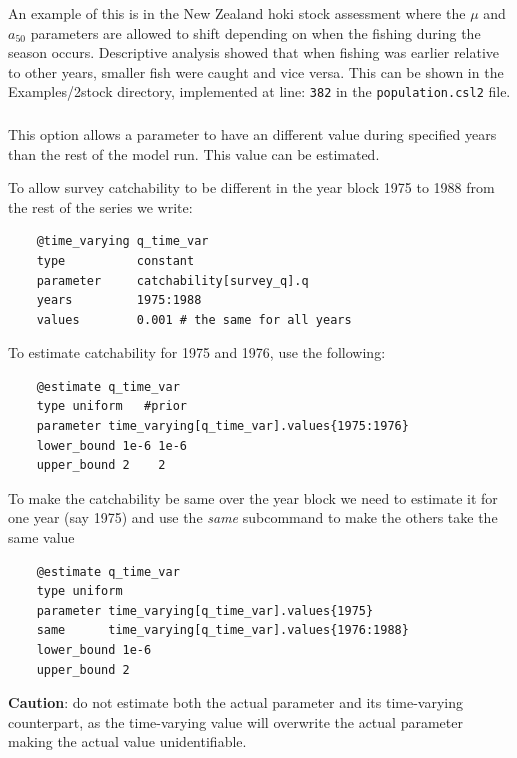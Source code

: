 An example of this is in the New Zealand hoki stock assessment where the $\mu$ and $a_{50}$ parameters are allowed to shift depending on when the fishing during the season occurs. Descriptive analysis showed that when fishing was earlier relative to other years, smaller fish were caught and vice versa. This can be shown in the Examples/2stock directory, implemented at line: \texttt{382} in the \texttt{population.csl2} file.

\subsubsection[Constant (year blocks)]{}\label{sec:TimeVarying-Constant}

This option allows a parameter to have an different value during specified years than the rest of the model run. This value can be estimated.

To allow survey catchability to be different in the year block 1975 to 1988 from the rest of the series we write:

{\small{\begin{verbatim}
	@time_varying q_time_var
	type          constant
	parameter     catchability[survey_q].q
	years         1975:1988
	values        0.001 # the same for all years
\end{verbatim}}}

To estimate catchability for 1975 and 1976, use the following:

{\small{\begin{verbatim}
	@estimate q_time_var
	type uniform   #prior
	parameter time_varying[q_time_var].values{1975:1976}
	lower_bound 1e-6 1e-6
	upper_bound 2    2
\end{verbatim}}}

To make the catchability be same over the year block we need to estimate it for one year (say 1975) and use the \textit{same} subcommand to make the others take the same value

{\small{\begin{verbatim}
	@estimate q_time_var
	type uniform
	parameter time_varying[q_time_var].values{1975}
	same      time_varying[q_time_var].values{1976:1988}
	lower_bound 1e-6
	upper_bound 2
\end{verbatim}}}

\textbf{Caution}: do not estimate both the actual parameter and its time-varying counterpart, as the time-varying value will overwrite the actual parameter making the actual value unidentifiable. 

